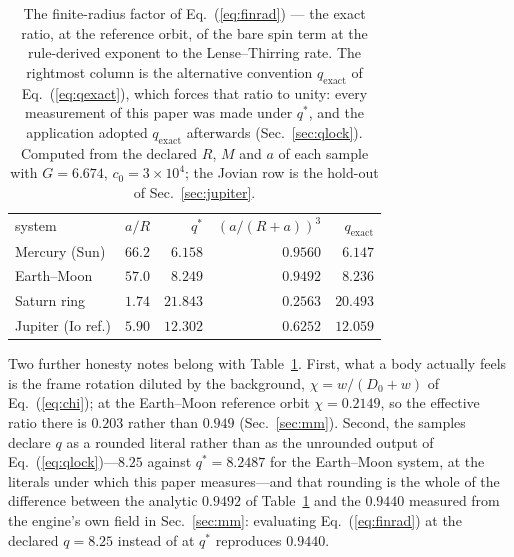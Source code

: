 \documentclass[aps,reprint,amsmath,amssymb,nofootinbib,superscriptaddress,floatfix]{revtex4-2}
\begin{document}
\begin{table}[t]
\caption{The finite-radius factor of Eq.~(\ref{eq:finrad}) --- the
  exact ratio, at the reference orbit, of the bare spin term at the
  rule-derived exponent to the Lense--Thirring rate. The rightmost
  column is the alternative convention $q_{\mathrm{exact}}$ of
  Eq.~(\ref{eq:qexact}), which forces that ratio to unity: every
  measurement of this paper was made under $q^{*}$, and the
  application adopted $q_{\mathrm{exact}}$ afterwards
  (Sec.~\ref{sec:qlock}). Computed from the declared $R$, $M$ and $a$ of
  each sample with $G=6.674$, $c_0=3\times10^{4}$; the Jovian row is the
  hold-out of Sec.~\ref{sec:jupiter}.}
\label{tab:finrad}
\begin{ruledtabular}
\begin{tabular}{lrrrr}
system & $a/R$ & $q^{*}$ & $(a/(R+a))^{3}$ & $q_{\mathrm{exact}}$ \\
\colrule
Mercury (Sun)      & $66.2$ & $6.158$  & $0.9560$ & $6.147$ \\
Earth--Moon        & $57.0$ & $8.249$  & $0.9492$ & $8.236$ \\
Saturn ring        & $1.74$ & $21.843$ & $0.2563$ & $20.493$ \\
Jupiter (Io ref.)  & $5.90$ & $12.302$ & $0.6252$ & $12.059$ \\
\end{tabular}
\end{ruledtabular}
\end{table}

Two further honesty notes belong with Table~\ref{tab:finrad}.
First, what a body actually feels is the frame rotation diluted by the
background, $\chi=w/(D_0+w)$ of Eq.~(\ref{eq:chi}); at the Earth--Moon
reference orbit $\chi=0.2149$, so the effective ratio there is $0.203$
rather than $0.949$ (Sec.~\ref{sec:mm}).
Second, the samples declare $q$ as a rounded literal rather than as the
unrounded output of Eq.~(\ref{eq:qlock})---$8.25$ against
$q^{*}=8.2487$ for the Earth--Moon system, at the literals under which
this paper measures---and that rounding is the
whole of the difference between the analytic $0.9492$ of
Table~\ref{tab:finrad} and the $0.9440$ measured from the engine's own
field in Sec.~\ref{sec:mm}: evaluating Eq.~(\ref{eq:finrad}) at the
declared $q=8.25$ instead of at $q^{*}$ reproduces $0.9440$.
\end{document}

